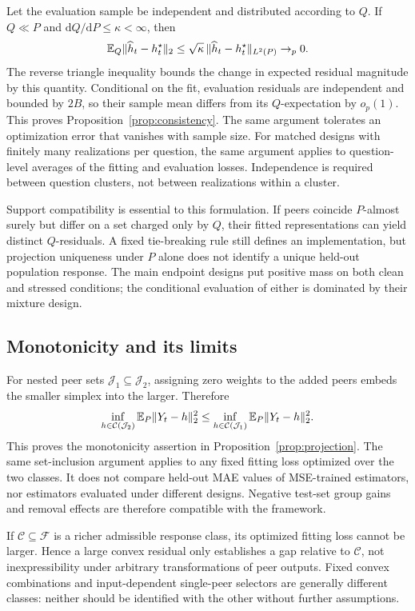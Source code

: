 Let the evaluation sample be independent and distributed according to $Q$. If $Q\ll P$ and $\mathrm dQ/\mathrm dP\leq\kappa<\infty$, then
\begin{equation}
\mathbb{E}_Q\|\widehat h_t-h_t^\star\|_2
\leq\sqrt{\kappa}\,\|\widehat h_t-h_t^\star\|_{L^2(P)}\to_p0.
\end{equation}
The reverse triangle inequality bounds the change in expected residual magnitude by this quantity. Conditional on the fit, evaluation residuals are independent and bounded by $2B$, so their sample mean differs from its $Q$-expectation by $o_p(1)$. This proves Proposition~\ref{prop:consistency}. The same argument tolerates an optimization error that vanishes with sample size. For matched designs with finitely many realizations per question, the same argument applies to question-level averages of the fitting and evaluation losses. Independence is required between question clusters, not between realizations within a cluster.

Support compatibility is essential to this formulation. If peers coincide $P$-almost surely but differ on a set charged only by $Q$, their fitted representations can yield distinct $Q$-residuals. A fixed tie-breaking rule still defines an implementation, but projection uniqueness under $P$ alone does not identify a unique held-out population response. The main endpoint designs put positive mass on both clean and stressed conditions; the conditional evaluation of either is dominated by their mixture design.

\subsection{Monotonicity and its limits}
For nested peer sets $\mathcal J_1\subseteq\mathcal J_2$, assigning zero weights to the added peers embeds the smaller simplex into the larger. Therefore
\begin{equation}
\inf_{h\in\mathcal C(\mathcal J_2)}\mathbb{E}_P\|Y_t-h\|_2^2
\leq
\inf_{h\in\mathcal C(\mathcal J_1)}\mathbb{E}_P\|Y_t-h\|_2^2.
\end{equation}
This proves the monotonicity assertion in Proposition~\ref{prop:projection}. The same set-inclusion argument applies to any fixed fitting loss optimized over the two classes. It does not compare held-out MAE values of MSE-trained estimators, nor estimators evaluated under different designs. Negative test-set group gains and removal effects are therefore compatible with the framework.

If $\mathcal C\subseteq\mathcal F$ is a richer admissible response class, its optimized fitting loss cannot be larger. Hence a large convex residual only establishes a gap relative to $\mathcal C$, not inexpressibility under arbitrary transformations of peer outputs. Fixed convex combinations and input-dependent single-peer selectors are generally different classes: neither should be identified with the other without further assumptions.

